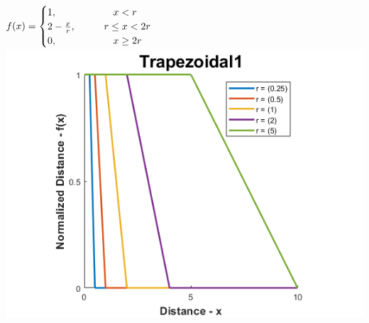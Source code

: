 \documentclass[12pt, a4paper, titlepage, openany]{book}
\begin{document}
\begin{description}[labelsep=1cm, labelwidth=2cm, nosep,style=multiline,leftmargin=3cm]
\begin{description}[labelsep=14em, labelwidth=10em, nosep,style=multiline,leftmargin=6cm]
	\item[\texttt{"trapezoidal1"}]	  $f(x) = \begin{cases} 1,  \hspace{20mm}  x<r 
	\\ 2 - \frac{x}{r},  \hspace{10mm} r\le x<2r 
	\\ 0,  \hspace{20mm}  x\ge 2r \end{cases}$\\
		\includegraphics[scale=.5]{FuzzTrap1v1.png} \\ 


\end{description}
\end{description}
\end{document}
